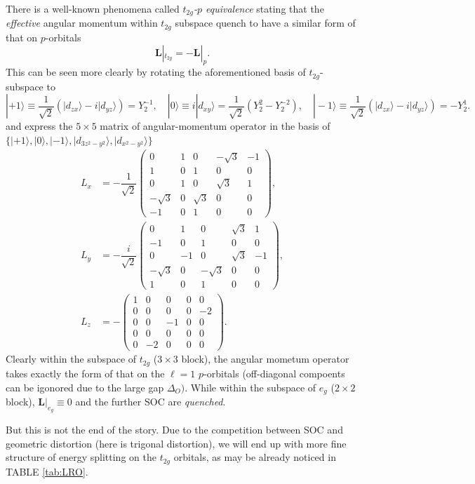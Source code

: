 \documentclass[10pt,nofootinbib,letterpaper]{revtex4}
\begin{document}
		There is a well-known phenomena called \emph{$t_{2g}$-$p$ equivalence} \cite{sugano2012multiplets} stating that the \emph{effective} angular momentum within $t_{2g}$ subspace quench to have a similar form of that on $p$-orbitals
		\begin{equation}\label{1.1.1}
			\mathbf{L}|_{t_{2g}}=-\mathbf{L}|_{p}.
		\end{equation}
		This can be seen more clearly by rotating the aforementioned basis of $t_{2g}$-subspace to
		\begin{equation*}
			|+1\rangle\equiv\dfrac{1}{\sqrt 2}(|d_{zx}\rangle-i|d_{yz}\rangle)=Y_2^{-1},\quad |0\rangle\equiv i|d_{xy}\rangle=\dfrac{1}{\sqrt{2}}(Y_2^2-Y_2^{-2}),\quad|-1\rangle\equiv\dfrac{1}{\sqrt 2}(|d_{zx}\rangle-i|d_{yz}\rangle)=-Y_2^1.
		\end{equation*}
		and express the $5\times 5$ matrix of angular-momentum operator in the basis of $\{|+1\rangle,|0\rangle,|-1\rangle,|d_{3z^2-y^2}\rangle,|d_{x^2-y^2}\rangle\}$
		\begin{align*}
			L_x&=-\dfrac{1}{\sqrt 2}\left(\begin{array}{ccc|cc}
				0 & 1 & 0 & -\sqrt3 & -1\\
				1 & 0 & 1 & 0 & 0\\
				0 & 1 & 0 & \sqrt3 & 1\\
				\hline
				-\sqrt3 & 0 & \sqrt3 & 0 & 0\\
				-1 & 0 & 1 & 0 & 0
			\end{array}\right),\\[1em]
			L_y&=-\dfrac{i}{\sqrt{2}}\left(\begin{array}{ccc|cc}
				0 & 1 & 0 & \sqrt3 & 1\\
				-1 & 0 & 1 & 0 & 0\\
				0 & -1 & 0 & \sqrt3 & -1\\
				\hline
				-\sqrt3 & 0 & -\sqrt{3} & 0 & 0\\
				1 & 0 & 1 & 0 & 0
			\end{array}\right),\\[1em]
			L_z&=-\left(\begin{array}{ccc|cc}
				1 & 0 & 0 & 0 & 0\\
				0 & 0 & 0 & 0 & -2\\
				0 & 0 & -1 & 0 & 0\\
				\hline
				0 & 0 & 0 & 0 & 0\\
				0 & -2 & 0 & 0 & 0
			\end{array} \right).
		\end{align*}
		Clearly within the subspace of $t_{2g}$ ($3\times3$ block), the angular mometum operator takes exactly the form of that on the $\ell=1$ $p$-orbitals (off-diagonal compoents can be igonored due to the large gap $\Delta_O)$. While within the subspace of $e_g$ ($2\times2$ block), $\mathbf{L}|_{e_g}\equiv0$ and the further SOC are \emph{quenched}.\par
		But this is not the end of the story. Due to the competition between SOC and geometric distortion (here is trigonal distortion), we will end up with more fine structure of energy splitting on the $t_{2g}$ orbitals, as may be already noticed in TABLE \ref{tab:LRO}.
	
\end{document}
